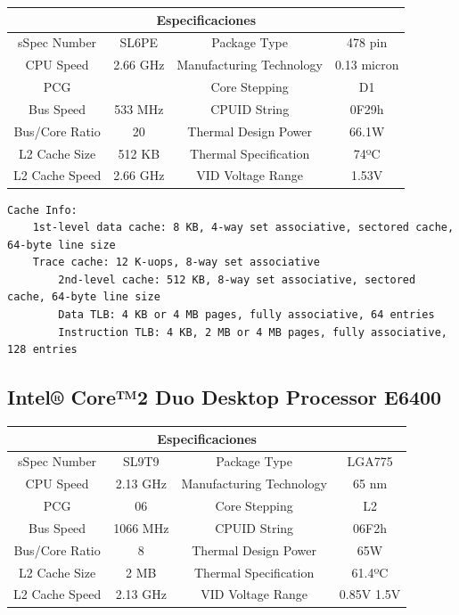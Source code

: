 \documentclass[a4paper,10pt]{article}
\begin{document}
\begin{tabular}{|c|c||c|c|}
\hline
\multicolumn{4}{|c|}{Especificaciones} \\
\hline
sSpec Number & SL6PE & Package Type & 478 pin \\
\hline
CPU Speed & 2.66 GHz & Manufacturing Technology & 0.13 micron \\
\hline
PCG & & Core Stepping & D1 \\
\hline
Bus Speed & 533 MHz & CPUID String & 0F29h \\
\hline
Bus/Core Ratio & 20 & Thermal Design Power & 66.1W \\
\hline
L2 Cache Size & 512 KB & Thermal Specification & 74ºC \\
\hline
L2 Cache Speed & 2.66 GHz & VID Voltage Range & 1.53V \\
\hline
\end{tabular}

\begin{verbatim}
Cache Info:
	1st-level data cache: 8 KB, 4-way set associative, sectored cache, 64-byte line size
	Trace cache: 12 K-uops, 8-way set associative
        2nd-level cache: 512 KB, 8-way set associative, sectored cache, 64-byte line size
        Data TLB: 4 KB or 4 MB pages, fully associative, 64 entries
        Instruction TLB: 4 KB, 2 MB or 4 MB pages, fully associative, 128 entries
\end{verbatim}

\subsection{Intel® Core™2 Duo Desktop Processor E6400}

\begin{tabular}{|c|c||c|c|}
\hline
\multicolumn{4}{|c|}{Especificaciones} \\
\hline
sSpec Number  & SL9T9  & Package Type & LGA775 \\
\hline
CPU Speed  & 2.13 GHz  & Manufacturing Technology & 65 nm \\
\hline
PCG  & 06  & Core Stepping & L2 \\
\hline
Bus Speed  & 1066 MHz  & CPUID String & 06F2h \\
\hline
Bus/Core Ratio  & 8  & Thermal Design Power & 65W \\
\hline
L2 Cache Size  & 2 MB & Thermal Specification & 61.4ºC \\
\hline
L2 Cache Speed  & 2.13 GHz & VID Voltage Range & 0.85V  1.5V \\
\hline
\end{tabular}
\end{document}
